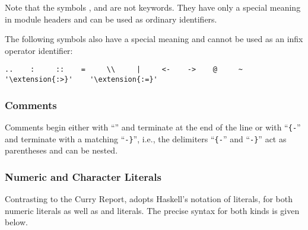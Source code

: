 Note that the symbols , 
and  are not keywords.
They have only a special meaning in module headers
and can be used as ordinary identifiers.

The following symbols also have a special meaning and cannot
be used as an infix operator identifier:
\begin{lstlisting}[escapechar=']
..    :     ::    =     \\     |     <-    ->    @     ~     '\extension{:>}'    '\extension{:=}'
\end{lstlisting}

\subsubsection{Comments}

Comments begin either with ``\term{--}'' and terminate at the end of the line
or with ``\verb|{-|'' and terminate with a matching ``\verb|-}|'', i.e.,
the delimiters ``\verb|{-|'' and ``\verb|-}|''
act as parentheses and can be nested.

\subsubsection{Numeric and Character Literals}

Contrasting to the Curry Report, \CYS adopts Haskell's notation of literals,
for both numeric literals as well as  and  literals.
The precise syntax for both kinds is given below.

